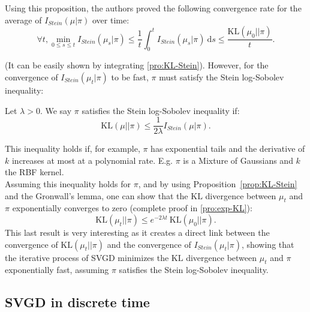 \documentclass[runningheads,a4paper]{llncs}
\newcommand{\KL}{\mathrm{KL}}
\renewcommand{\d}{\: \mathrm{d}}
\newcommand{\Stein}{I_{Stein}(\mu | \pi)}
\begin{document}
Using this proposition, the authors proved the following convergence rate
for the average of $\Stein$ over time:
\begin{equation}
  \forall t, \min_{0 \leq s \leq t} I_{Stein}(\mu_s | \pi)
    \leq \frac{1}{t} \int_0^t I_{Stein}(\mu_s | \pi) \d s
    \leq \frac{\KL(\mu_0 || \pi)}{t}.
  \label{eq:convergence-avg-stein}
\end{equation}

(It can be easily shown by integrating \ref{pro:KL-Stein}).
However, for the convergence of $I_{Stein}(\mu_t | \pi)$ to be fast,
$\pi$ must satisfy the Stein log-Sobolev inequality:

\begin{definition}
  Let $\lambda > 0$. We say $\pi$ satisfies the Stein log-Sobolev inequality if:
  $$
  \KL(\mu || \pi) \leq \frac{1}{2 \lambda} \Stein.
  $$
\end{definition}
\noindent
This inequality holds if, for example, $\pi$ has exponential tails and the derivative of $k$
increases at most at a polynomial rate. E.g. $\pi$ is a Mixture of Gaussians
and $k$ the RBF kernel.\\
Assuming this inequality holds for $\pi$, and by using Proposition~\ref{prop:KL-Stein}
and the Gronwall's lemma,
one can show that the $\KL$ divergence between $\mu_t$ and $\pi$ exponentially
converges to zero (complete proof in \ref{pro:exp-KL}):
\begin{equation}
  \KL(\mu_t || \pi) \leq e^{-2 \lambda t} \: \KL(\mu_0 || \pi).
  \label{eq:exp-KL}
\end{equation}
This last result is very interesting as it creates a direct link between the
convergence of $\KL(\mu_t || \pi)$ and the convergence
of $I_{Stein}(\mu_t | \pi)$, showing that the iterative process
of SVGD minimizes the $\KL$ divergence between $\mu_t$ and $\pi$ exponentially fast,
assuming $\pi$ satisfies the Stein log-Sobolev inequality.

\subsection{SVGD in discrete time}
\end{document}
